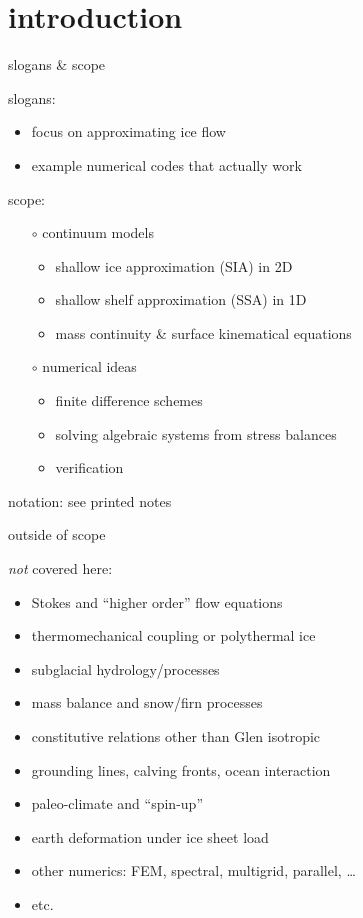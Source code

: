 
\section{introduction}

\begin{frame}{slogans \& scope}

slogans:
  \begin{itemize}
  \item \alert{focus on approximating ice flow}
  \item \alert{example numerical codes that actually work}
  \end{itemize}
\medskip

scope:
  \begin{itemize}
  \item[$\circ$] continuum models

    \begin{itemize}
    \item shallow ice approximation (SIA) in 2D
    \item shallow shelf approximation (SSA) in 1D
    \item mass continuity \& surface kinematical equations
    \end{itemize}

  \item[$\circ$] numerical ideas

    \begin{itemize}
    \item finite difference schemes
    \item solving algebraic systems from stress balances
    \item verification
    \end{itemize}
  \end{itemize}
\medskip

notation: see printed notes
\end{frame}


\begin{frame}{outside of scope}

\large\emph{not} \normalsize covered here:\normalsize
\medskip

  \begin{itemize}
  \item Stokes and ``higher order'' flow equations
  \item thermomechanical coupling or polythermal ice
  \item subglacial hydrology/processes
  \item mass balance and snow/firn processes
  \item constitutive relations other than Glen isotropic
  \item grounding lines, calving fronts, ocean interaction
  \item paleo-climate and ``spin-up''
  \item earth deformation under ice sheet load
  \item other numerics: FEM, spectral, multigrid, parallel, \dots
  \item etc.
  \end{itemize}

\end{frame}


